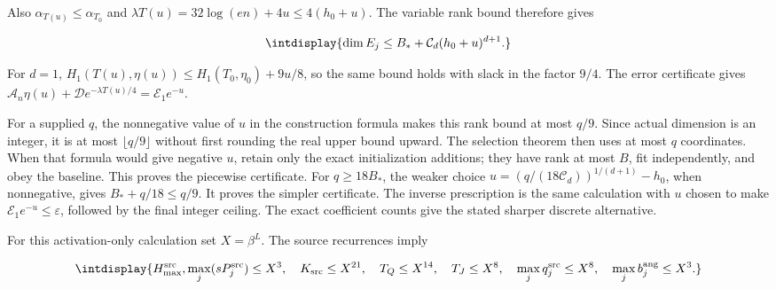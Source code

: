 
Also \(\alpha_{T(u)}\le\alpha_{T_0}\) and \(\lambda T(u)=32\log(en)+4u\le4(h_0+u)\). The variable rank bound therefore gives


\begingroup\renewcommand{\theHequation}{intdisplay.635}
\begin{equation}
\intdisplay{
\dim E_j\le B_*+\mathcal C_d(h_0+u)^{d+1}.
}
\label{int:eq-0270-harmonic-one-parameter-rank-bound}
\end{equation}
\endgroup


For \(d=1\), \(H_1(T(u),\allowbreak \eta(u))\le H_1(T_0,\allowbreak \eta_0)+9u/8\), so the same bound holds with slack in the factor \(9/4\). The error certificate gives \(\mathcal A_n\eta(u)+\mathcal De^{-\lambda T(u)/4} =\mathcal E_1e^{-u}\).



For a supplied \(q\), the nonnegative value of \(u\) in the construction formula makes this rank bound at most \(q/9\). Since actual dimension is an integer, it is at most \(\lfloor q/9\rfloor\) without first rounding the real upper bound upward. The selection theorem then uses at most \(q\) coordinates. When that formula would give negative \(u\), retain only the exact initialization additions; they have rank at most \(B\), fit independently, and obey the baseline. This proves the piecewise certificate. For \(q\ge18B_*\), the weaker choice \(u=(q/(18\mathcal C_d))^{1/(d+1)}-h_0\), when nonnegative, gives \(B_*+q/18\le q/9\). It proves the simpler certificate. The inverse prescription is the same calculation with \(u\) chosen to make \(\mathcal E_1e^{-u}\le\varepsilon\), followed by the final integer ceiling. The exact coefficient counts give the stated sharper discrete alternative.



For this activation-only calculation set \(X=\beta^L\). The source recurrences imply


\begingroup\renewcommand{\theHequation}{intdisplay.636}
\begin{equation*}
\intdisplay{
H_{\max}^{\rm src},\max_j(sP_j^{\rm src})\le X^3,\quad
K_{\rm src}\le X^{21},\quad T_Q\le X^{14},\quad T_J\le X^8,
\quad\max_jq_j^{\rm src}\le X^8,\quad
\max_jb_j^{\rm ang}\le X^3.
}
\end{equation*}
\endgroup

